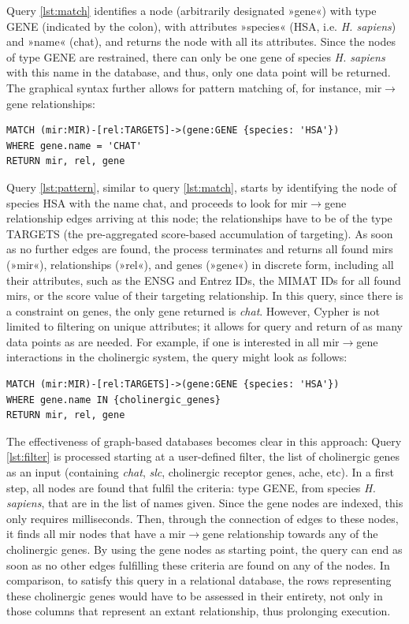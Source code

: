 Query \ref{lst:match} identifies a node (arbitrarily designated »gene«) with type GENE (indicated by the colon), with attributes »species« (HSA, i.e. \textit{H. sapiens}) and »name« (\ac{chat}), and returns the node with all its attributes. Since the nodes of type GENE are restrained, there can only be one gene of species \textit{H. sapiens} with this name in the database, and thus, only one data point will be returned. The graphical syntax further allows for pattern matching of, for instance, \ac{mir}$\to$gene relationships:

\begin{lstlisting}[label=lst:pattern,caption=Patterns,
language=Cypher]
MATCH (mir:MIR)-[rel:TARGETS]->(gene:GENE {species: 'HSA'})
WHERE gene.name = 'CHAT'
RETURN mir, rel, gene
\end{lstlisting}

Query \ref{lst:pattern}, similar to query \ref{lst:match}, starts by identifying the node of species HSA with the name \ac{chat}, and proceeds to look for \ac{mir}$\to$gene relationship edges arriving at this node; the relationships have to be of the type TARGETS (the pre-aggregated score-based accumulation of targeting). As soon as no further edges are found, the process terminates and returns all found \acp{mir} (»mir«), relationships (»rel«), and genes (»gene«) in discrete form, including all their attributes, such as the ENSG and Entrez IDs, the MIMAT IDs for all found \acp{mir}, or the score value of their targeting relationship. In this query, since there is a constraint on genes, the only gene returned is \textit{\ac{chat}}. However, Cypher is not limited to filtering on unique attributes; it allows for query and return of as many data points as are needed. For example, if one is interested in all \ac{mir}$\to$gene interactions in the cholinergic system, the query might look as follows:

\begin{lstlisting}[label=lst:filter,caption=Filtering,
language=Cypher]
MATCH (mir:MIR)-[rel:TARGETS]->(gene:GENE {species: 'HSA'})
WHERE gene.name IN {cholinergic_genes}
RETURN mir, rel, gene
\end{lstlisting}

The effectiveness of graph-based databases becomes clear in this approach: Query \ref{lst:filter} is processed starting at a user-defined filter, the list of cholinergic genes as an input (containing \textit{\ac{chat}}, \textit{\ac{slc}}, cholinergic receptor genes, \acl{ache}, etc). In a first step, all nodes are found that fulfil the criteria: type GENE, from species \textit{H. sapiens}, that are in the list of names given. Since the gene nodes are indexed, this only requires milliseconds. Then, through the connection of edges to these nodes, it finds all \ac{mir} nodes that have a \ac{mir}$\to$gene relationship towards any of the cholinergic genes. By using the gene nodes as starting point, the query can end as soon as no other edges fulfilling these criteria are found on any of the nodes. In comparison, to satisfy this query in a relational database, the rows representing these cholinergic genes would have to be assessed in their entirety, not only in those columns that represent an extant relationship, thus prolonging execution.

